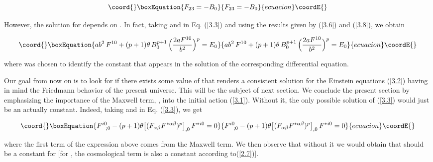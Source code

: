 \documentclass[a4paper,twocolumn,prd,superscriptaddress,nofootinbib,showpacs]
{revtex4}
\begin{document}
\begin{equation}\coord{}\boxEquation{
F_{23}=-B_0
\label{3.9}
}{
F_{23}=-B_0
}{ecuacion}\coordE{}\end{equation}

\medskip
However, the solution for \coordHE{} depends on \coordHE{}. In fact, taking
\coordHE{} and \coordHE{} in Eq. (\ref{3.3}) and using the results given by
(\ref{3.6}) and (\ref{3.8}), we obtain

\begin{equation}\coord{}\boxEquation{
ab^2\,F^{10}+(p+1)\theta\,B_0^{p+1}\,
\Bigl(\frac{2aF^{10}}{b^2}\Bigr)^p=E_0
\label{3.10}
}{
ab^2\,F^{10}+(p+1)\theta\,B_0^{p+1}\,
\Bigl(\frac{2aF^{10}}{b^2}\Bigr)^p=E_0
}{ecuacion}\coordE{}\end{equation}

\noindent
where \coordHE{} was chosen to identify the constant that appears in the
solution of the corresponding differential equation.

\medskip
Our goal from now on is to look for if there exists some value of \coordHE{}
that renders a consistent solution for the Einstein equations
(\ref{3.2}) having in mind the Friedmann behavior of the present
universe. This will be the subject of next section. We conclude the
present section by emphasizing the importance of the Maxwell term,
\coordHE{}, into the initial action
(\ref{3.1}). Without it, the only possible solution of (\ref{3.3})
would just be an actually constant. Indeed, taking \coordHE{} and \coordHE{} in Eq. (\ref{3.3}), we get

\begin{equation}\coord{}\boxEquation{
F^{i0}_{\phantom{i0};0}
-(p+1)\theta\bigl[(F_{\alpha\beta}F^{\ast\alpha\beta})^p\bigr]_{,0}\,
F^{\ast i0}=0
\label{3.11}
}{
F^{i0}_{\phantom{i0};0}
-(p+1)\theta\bigl[(F_{\alpha\beta}F^{\ast\alpha\beta})^p\bigr]_{,0}\,
F^{\ast i0}=0
}{ecuacion}\coordE{}\end{equation}

\noindent
where the first term of the expression above comes from the Maxwell
term. We then observe that without it we would obtain that
\coordHE{} should be a constant for
\coordHE{} [for \coordHE{}, the cosmological term is also a constant
according to(\ref{2.7})].
\end{document}
